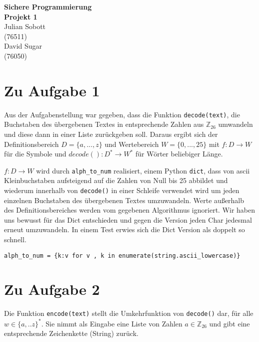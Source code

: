 \documentclass[12pt]{article}
\begin{document}
\begin{center}
  \textbf{\LARGE Sichere Programmierung} \\[1ex]%
  \textbf{\Large Projekt 1}\\[2ex] %
  Julian Sobott \\ %
  (76511) \\ %
  David Sugar \\ %
  (76050) \\ %
  
\end{center}

\section{Zu Aufgabe 1}
Aus der Aufgabenstellung war gegeben, dass die Funktion \texttt{decode(text)}, die Buchstaben des übergebenen Textes in entsprechende Zahlen aus $\mathbb{Z}_{26}$ umwandeln und diese dann in einer Liste zurückgeben soll. Daraus ergibt sich der Definitionsbereich $D = \{a,...,z\}$ und Wertebereich $W = \{0,...,25\}$ mit $f: D \to W$ für die Symbole und $decode(): D^{*} \to W^{*}$ für Wörter beliebiger Länge.  

$f: D \to W$ wird durch \texttt{alph\_to\_num} realisiert, einem Python \texttt{dict}, dass von ascii Kleinbuchstaben aufsteigend auf die Zahlen von Null bis 25 abbildet und wiederum innerhalb von \texttt{decode()} in einer Schleife verwendet wird um jeden einzelnen Buchstaben des übergebenen Textes umzuwandeln. Werte außerhalb des Definitionsbereiches werden vom gegebenen Algorithmus ignoriert. Wir haben uns bewusst für das Dict entschieden und gegen die Version jeden Char jedesmal erneut umzuwandeln. In einem Test erwies sich die Dict Version als doppelt so schnell.
\begin{lstlisting}
alph_to_num = {k:v for v , k in enumerate(string.ascii_lowercase)}
\end{lstlisting}




\section{Zu Aufgabe 2}
Die Funktion \texttt{encode(text)} stellt die Umkehrfunktion von \texttt{decode()} dar, für alle $w \in \{a,..z\}^{*}$. Sie nimmt als Eingabe eine Liste von Zahlen $a \in \mathbb{Z}_{26}$ und gibt eine entsprechende Zeichenkette (String) zurück.
\end{document}
